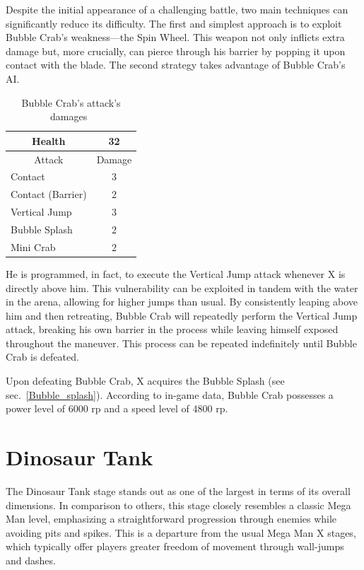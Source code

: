 Despite the initial appearance of a challenging battle, two main techniques can significantly reduce its difficulty. The first and simplest approach is to exploit Bubble Crab's weakness—the Spin Wheel. This weapon not only inflicts extra damage but, more crucially, can pierce through his barrier by popping it upon contact with the blade. The second strategy takes advantage of Bubble Crab's AI.\begin{table}[htp]
	\centering
	\begin{tabular}[h]{l c}
		\toprule
		\multicolumn{1}{c}{Health}  & 32 \\
		\midrule
		\multicolumn{1}{c}{Attack} & \multicolumn{1}{c}{Damage}\\
		Contact & 3 \\
		Contact (Barrier) & 2\\
		Vertical Jump& 3\\
		Bubble Splash & 2\\
		Mini Crab & 2\\
		\bottomrule
	\end{tabular}
	\caption{Bubble Crab's attack's damages~\cite{wiki:Bubble_Crab}}
\end{table} He is programmed, in fact, to execute the Vertical Jump attack whenever X is directly above him. This vulnerability can be exploited in tandem with the water in the arena, allowing for higher jumps than usual. By consistently leaping above him and then retreating, Bubble Crab will repeatedly perform the Vertical Jump attack, breaking his own barrier in the process while leaving himself exposed throughout the maneuver. This process can be repeated indefinitely until Bubble Crab is defeated.


Upon defeating Bubble Crab, X acquires the Bubble Splash (see sec.~\ref{Bubble_splash}). According to in-game data, Bubble Crab possesses a power level of 6000 rp and a speed level of 4800 rp.

\section{Dinosaur Tank}


The Dinosaur Tank stage stands out as one of the largest in terms of its overall dimensions. In comparison to others, this stage closely resembles a classic Mega Man level, emphasizing a straightforward progression through enemies while avoiding pits and spikes. This is a departure from the usual Mega Man X stages, which typically offer players greater freedom of movement through wall-jumps and dashes. 

